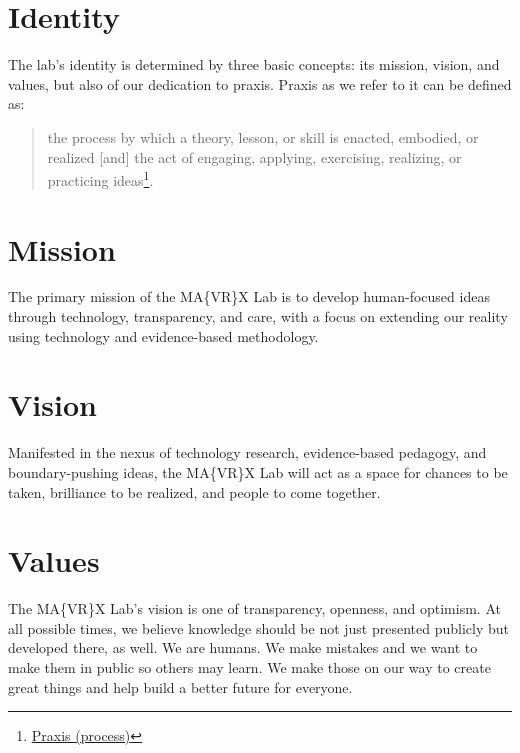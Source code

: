 \documentclass[]{tufte-book}
\begin{document}
\hypertarget{identity}{%
\section*{Identity}\label{identity}}

The lab's identity is determined by three basic concepts: its mission, vision, and values, but also of our dedication to praxis. Praxis as we refer to it can be defined as:

\begin{quote}
the process by which a theory, lesson, or skill is enacted, embodied, or realized {[}and{]} the act of engaging, applying, exercising, realizing, or practicing ideas\footnote{\href{https://en.wikipedia.org/wiki/Praxis_(process)}{Praxis (process)}}.
\end{quote}

\hypertarget{mission}{%
\section*{Mission}\label{mission}}

The primary mission of the MA\{VR\}X Lab is to develop human-focused ideas through technology, transparency, and care, with a focus on extending our reality using technology and evidence-based methodology.

\hypertarget{vision}{%
\section*{Vision}\label{vision}}

Manifested in the nexus of technology research, evidence-based pedagogy, and boundary-pushing ideas, the MA\{VR\}X Lab will act as a space for chances to be taken, brilliance to be realized, and people to come together.

\hypertarget{values}{%
\section*{Values}\label{values}}

The MA\{VR\}X Lab's vision is one of transparency, openness, and optimism. At all possible times, we believe knowledge should be not just presented publicly but developed there, as well. We are humans. We make mistakes and we want to make them in public so others may learn. We make those on our way to create great things and help build a better future for everyone.
\end{document}
